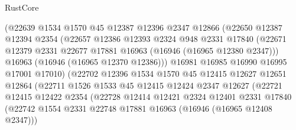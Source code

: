 \begin{lexlean}{RustCore}
\begin{coremodule}
                        (@22639
                          @1534
                          @1570
                          @45
                          @12387
                          @12396
                          @2347
                          @12866
                          (@22650
                            @12387
                            @12394
                            @2354
                            (@22657
                              @12386
                              @12393
                              @2324
                              @948
                              @2331
                              @17840
                              (@22671
                                @12379
                                @2331
                                @22677
                                @17881
                                @16963
                                (@16946 (@16965 @12380 @2347)))
                              @16963
                              (@16946 (@16965 @12370 @12386)))
                            @16981
                            @16985
                            @16990
                            @16995
                            @17001
                            @17010)
                          (@22702
                            @12396
                            @1534
                            @1570
                            @45
                            @12415
                            @12627
                            @12651
                            @12864
                            (@22711
                              @1526
                              @1533
                              @45
                              @12415
                              @12424
                              @2347
                              @12627
                              (@22721
                                @12415
                                @12422
                                @2354
                                (@22728
                                  @12414
                                  @12421
                                  @2324
                                  @12401
                                  @2331
                                  @17840
                                  (@22742
                                    @1554
                                    @2331
                                    @22748
                                    @17881
                                    @16963
                                    (@16946 (@16965 @12408 @2347)))

\end{coremodule}
\end{lexlean}
